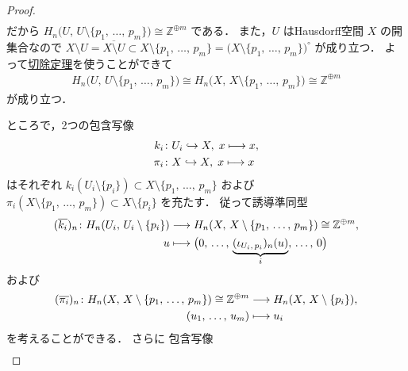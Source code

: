 \documentclass[algtopo_main]{subfiles}
\begin{document}
\begin{proof}
\begin{align}
    \end{align}
    だから $H_n \bigl( U,\, U \setminus  \{p_1,\, \dots ,\, p_m\} \bigr) \cong \mathbb{Z}^{\oplus m}$ である．
    また，$U$ はHausdorff空間 $X$ の開集合なので
    $X \setminus U = \overline{X \setminus U} \subset X \setminus \{p_1,\, \dots ,\, p_m\} = \bigl( X \setminus \{p_1,\, \dots ,\, p_m\} \bigr)^\circ$
    が成り立つ．
    よって\hyperref[thm:exc]{切除定理}を使うことができて
    \begin{align}
        \label{cmtd:loc-deg-2}
        H_n\bigl(U,\, U \setminus \{ p_1,\, \dots ,\, p_m \}\bigr) \cong H_n\bigl(X,\, X \setminus \{ p_1,\, \dots ,\, p_m \}\bigr) \cong \mathbb{Z}^{\oplus m}
    \end{align}
    が成り立つ．

    ところで，2つの包含写像
    \begin{align}
        k_i &\colon U_i \hookrightarrow X,\; x \longmapsto x, \\
        \pi_i &\colon X \hookrightarrow X,\; x \longmapsto x
    \end{align}
    はそれぞれ $k_i(U_i \setminus \{p_i\}) \subset X \setminus \{p_1,\, \dots ,\, p_m\}$ および $\pi_i(X \setminus \{p_1,\, \dots ,\, p_m\}) \subset X \setminus \{p_i\}$ を充たす．
    従って誘導準同型
    \begin{align}
        \label{cmtd:loc-deg-3}
        (\overline{k_i})_n \colon H_n (U_i,\, U_i \setminus \{p_i\}) &\longrightarrow H_n (X,\,X\setminus \{p_1,\, \dots ,\, p_m\}) \cong \mathbb{Z}^{\oplus m},\\
        u &\longmapsto \bigl(0,\, \dots,\, \underbrace{(\iota_{U_i,\, p_i})_n(u)}_{i},\, \dots ,\, 0\bigr)
    \end{align}
    および
    \begin{align}
        \label{cmtd:loc-deg-4}
        (\overline{\pi_i})_n \colon H_n (X,\, X \setminus \{p_1,\, \dots ,\, p_m\}) \cong \mathbb{Z}^{\oplus m} &\longrightarrow H_n (X,\,X\setminus \{p_i\}),\\
        (u_1,\, \dots ,\, u_m) &\longmapsto u_i
    \end{align}
    を考えることができる．
    さらに
    包含写像 
    \begin{align}

\end{align}
\end{proof}
\end{document}
